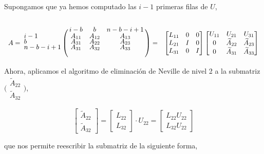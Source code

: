 \documentclass[a4paper,12pt]{article}
\begin{document}
Supongamos que ya hemos computado las $i-1$ primeras filas de $U$,


\begin{equation}
\begin{array}{l l}
  		A =
  		\bordermatrix{
  				 	& i-b & b & n-b-i+1 \cr
                	i-1     & A_{11} & A_{12} & A_{13}\\
                	b       & A_{31} & A_{22} & A_{23}\\
                	n-b-i+1 & A_{31} & A_{32} & A_{33}
                }
	  = &
	  \begin{bmatrix}
			L_{11} & 0 & 0 \\
			L_{21} & I & 0 \\
			L_{31} & 0 & I	  	
	  \end{bmatrix}
	  \begin{bmatrix}
			U_{11} & U_{21} & U_{31} \\
			0 & \widetilde{A}_{22} & \widetilde{A}_{23} \\
			0 & \widetilde{A}_{31} & \widetilde{A}_{33}
	  \end{bmatrix}\\
\end{array}
\end{equation}

\bigskip

Ahora, aplicamos el algoritmo de eliminaci\'on de Neville de nivel 2 a la submatriz $\bigl(\begin{smallmatrix}
\widetilde{A}_{22}\\ \widetilde{A}_{32}
\end{smallmatrix} \bigr)$,

\begin{equation}
	\begin{bmatrix}
		\widetilde{A}_{22} \\
		\widetilde{A}_{32}
	\end{bmatrix}
	=
	\begin{bmatrix}
		L_{22} \\
		L_{32}
	\end{bmatrix}
	\cdot
	U_{22}
	=
	\begin{bmatrix}
		L_{22} U_{22} \\
		L_{32} U_{22}
	\end{bmatrix}
\end{equation}

que nos permite reescribir la submatriz de la siguiente forma,
\end{document}
